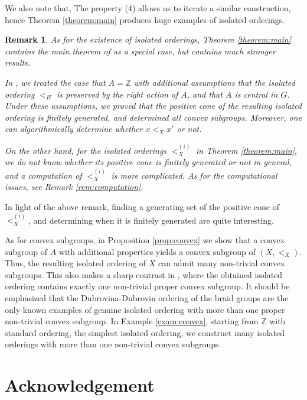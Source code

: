 \documentclass[10pt]{amsart}
\newtheorem{remark}[theorem]{Remark}}
\numberwithin{equation}{section}
\begin{document}
We also note that, The property (4) allows us to iterate a similar construction, hence Theorem \ref{theorem:main} produces huge examples of isolated orderings.

\begin{remark}
As for the existence of isolated orderings, Theorem \ref{theorem:main} contains the main theorem of \cite{i2} as a special case, but \cite[Theorem 1.1]{i2} contains much stronger results.

In \cite{i2}, we treated the case that $A={\mathbb{Z}}$ with additional assumptions that the isolated ordering $<_{H}$ is preserved by the right action of $A$, and that $A$ is central in $G$. Under these assumptions, we proved that the positive cone of the resulting isolated ordering is \emph{finitely generated}, and determined all convex subgroups. Moreover, one can algorithmically determine whether $x<_{X} x'$ or not.

On the other hand, for the isolated orderings $<_{X}^{(i)}$ in Theorem \ref{theorem:main}, we do not know whether its positive cone is finitely generated or not in general, and a computation of $<_{X}^{(i)}$ is more complicated. As for the computational issues, see Remark \ref{rem:computation}.
\end{remark}

In light of the above remark, finding a generating set of the positive cone of $<_{X}^{(i)}$, and determining when it is finitely generated are quite interesting.

As for convex subgroups, in Proposition \ref{prop:convex} we show that a  convex subgroup of $A$ with additional properties yields a convex subgroup of $(X,<_{X})$. Thus, the resulting isolated ordering of $X$ can admit many non-trivial convex subgroups. This also makes a sharp contrast in \cite{i2}, where the obtained isolated ordering contains exactly one non-trivial proper convex subgroup. 
It should be emphasized that the Dubrovina-Dubrovin ordering of the braid groups \cite{dd} are the only known examples of genuine isolated ordering with more than one proper non-trivial convex subgroup. In Example \ref{exam:convex}, starting from ${\mathbb{Z}}$ with standard ordering, the simplest isolated ordering, we construct many isolated orderings with more than one non-trivial convex subgroups.

\section*{Acknowledgement}
\end{document}
